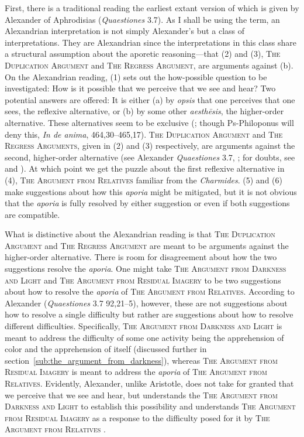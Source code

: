 First, there is a traditional reading the earliest extant version of which is given by Alexander of Aphrodisias (\emph{Quaestiones} 3.7). As I shall be using the term, an Alexandrian interpretation is not simply Alexander's but a class of interpretations. They are Alexandrian since the interpretations in this class share a structural assumption about the aporetic reasoning—that (2) and (3), \textsc{The Duplication Argument} and \textsc{The Regress Argument}, are arguments against (b). On the Alexandrian reading, (1) sets out the how-possible question to be investigated: How is it possible that we perceive that we see and hear? Two potential answers are offered: It is either (a) by \emph{opsis} that one perceives that one sees, the reflexive alternative, or (b) by some other \emph{aesthēsis}, the higher-order alternative. These alternatives seem to be exclusive (\citealt[401]{Osborne:1983le}; though Ps-Philoponus will deny this, \emph{In de anima}, 464,30–465,17). \textsc{The Duplication Argument} and \textsc{The Regress Arguments}, given in (2) and (3) respectively, are arguments against the second, higher-order alternative (see Alexander \emph{Quaestiones} 3.7, \citealt[433]{Hicks:1907uq}; for doubts, see \citealt{Kosman:2014ab} and \citealt{Osborne:1983le}). At which point we get the puzzle about the first reflexive alternative in (4), \textsc{The Argument from Relatives} familiar from the \emph{Charmides}. (5) and (6) make suggestions about how this \emph{aporia} might be mitigated, but it is not obvious that the \emph{aporia} is fully resolved by either suggestion or even if both suggestions are compatible.

What is distinctive about the Alexandrian reading is that \textsc{The Duplication Argument} and \textsc{The Regress Argument} are meant to be arguments against the higher-order alternative. There is room for disagreement about how the two suggestions resolve the \emph{aporia}. One might take \textsc{The Argument from Darkness and Light} and \textsc{The Argument from Residual Imagery} to be two suggestions about how to resolve the \emph{aporia} of \textsc{The Argument from Relatives}. According to Alexander (\emph{Quaestiones} 3.7 92,21–5), however, these are not suggestions about how to resolve a single difficulty but rather are suggestions about how to resolve different difficulties. Specifically, \textsc{The Argument from Darkness and Light} is meant to address the difficulty of some one activity being the apprehension of color and the apprehension of itself (discussed further in section~\ref{sub:the_argument_from_darkness}), whereas \textsc{The Argument from Residual Imagery} is meant to address the \emph{aporia} of \textsc{The Argument from Relatives}. Evidently, Alexander, unlike Aristotle, does not take for granted that we perceive that we see and hear, but understands the \textsc{The Argument from Darkness and Light} to establish this possibility and understands \textsc{The Argument from Residual Imagery} as a response to the difficulty posed for it by \textsc{The Argument from Relatives} \citep[325]{Lautner:2014cz}.

